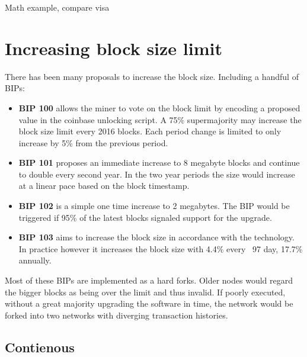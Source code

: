 
Math example, compare visa 

\section{Increasing block size limit}

There has been many proposals to increase the block size. Including a handful of BIPs:

\begin{itemize}
	
	\item \textbf{BIP 100} allows the miner to vote on the block limit by encoding a proposed value in the coinbase unlocking script. A 75\% supermajority may increase the block size limit every 2016 blocks. Each period change is limited to only increase by 5\% from the previous period.\cite{bip:0100:dynamic:block:size}
	
	\item \textbf{BIP 101} proposes an immediate increase to 8 megabyte blocks and continue to double every second year. In the two year periods the size would increase at a linear pace based on the block timestamp.\cite{bip:0101:increase:block:size}
	
	\item \textbf{BIP 102} is a simple one time increase to 2 megabytes. The BIP would be triggered if 95\% of the latest blocks signaled support for the upgrade.\cite{bip:0102:increase:2mb}
	
	\item \textbf{BIP 103} aims to increase the block size in accordance with the technology. In practice however it increases the block size with 4.4\% every ~97 day, 17.7\% annually. \cite{bip:0103:increase:with:technology}
\end{itemize}

Most of these BIPs are implemented as a hard forks. Older nodes would regard the bigger blocks as being over the limit and thus invalid.
If poorly executed, without a great majority upgrading the software in time, the network would be forked into two networks with diverging transaction histories. 

\subsection{Contienous }

